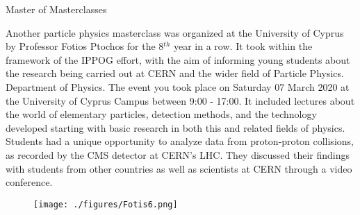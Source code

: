 \begin{MyArticle}[enhanced, tikz={rotate=0}, width=0.6\textwidth]{Master of Masterclasses}
  \begin{multicols}{2}
    Another particle physics masterclass was organized at the University of Cyprus
    by Professor Fotios Ptochos for the 8$^{th}$ year
    in a row. It took within the framework of the IPPOG effort,  with
    the aim of informing young students about the research being
    carried out at CERN and the wider field of Particle Physics.
    Department of Physics. The event you took place on Saturday 07 March
    2020 at the University of Cyprus Campus between 9:00 - 17:00. It 
    included lectures about the world of elementary particles,
    detection methods, and the technology developed starting with
    basic research in both this and related fields of physics. Students had a unique opportunity to
    analyze data from proton-proton collisions, as recorded by the CMS
    detector at CERN's LHC. They discussed their
    findings with students from other countries as well as scientists
    at CERN through a video conference.
    \begin{figure}
      \begin{center}
        \leavevmode
        \texttt{[image: ./figures/Fotis6.png]}
      \end{center}
    \end{figure}
  \end{multicols}
\end{MyArticle}
